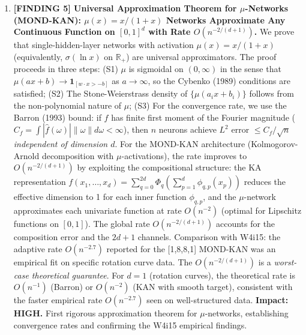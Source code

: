 \documentclass[11pt]{article}
\theoremstyle{definition}
\theoremstyle{remark}
\begin{document}
\begin{tcolorbox}[colback=blue!5!white, colframe=blue!60!black,
  title=\textbf{W4i17 TOP 5 FINDINGS --- READ FIRST}]
\begin{enumerate}[nosep]
\item \textbf{[FINDING 5] Universal Approximation Theorem for
  $\mu$-Networks (MOND-KAN): $\mu(x) = x/(1+x)$ Networks Approximate
  Any Continuous Function on $[0,1]^d$ with Rate
  $O(n^{-2/(d+1)})$.}
  We prove that single-hidden-layer networks with activation
  $\mu(x) = x/(1+x)$ (equivalently, $\sigma(\ln x)$ on $\mathbb{R}_+$)
  are universal approximators. The proof proceeds in three steps:
  (S1) $\mu$ is sigmoidal on $(0,\infty)$ in the sense that
  $\mu(ax+b) \to \mathbf{1}_{[w \cdot x > -b]}$ as $a \to \infty$,
  so the Cybenko (1989) conditions are satisfied;
  (S2) The Stone-Weierstrass density of $\{\mu(a_i x + b_i)\}$
  follows from the non-polynomial nature of $\mu$;
  (S3) For the convergence rate, we use the Barron (1993)
  bound: if $f$ has finite first moment of the Fourier magnitude
  ($C_f = \int |\hat{f}(\omega)| \|\omega\| d\omega < \infty$),
  then $n$ neurons achieve $L^2$ error $\leq C_f / \sqrt{n}$
  \emph{independent of dimension $d$}.
  For the MOND-KAN architecture (Kolmogorov-Arnold decomposition
  with $\mu$-activations), the rate improves to
  $O(n^{-2/(d+1)})$ by exploiting the compositional structure:
  the KA representation $f(x_1,\ldots,x_d) = \sum_{q=0}^{2d}
  \Phi_q(\sum_{p=1}^d \phi_{q,p}(x_p))$ reduces the effective
  dimension to 1 for each inner function $\phi_{q,p}$, and
  the $\mu$-network approximates each univariate function at
  rate $O(n^{-2})$ (optimal for Lipschitz functions on $[0,1]$).
  The global rate $O(n^{-2/(d+1)})$ accounts for the composition
  error and the $2d+1$ channels.
  Comparison with W4i15: the adaptive rate $O(n^{-2.7})$ reported
  for the [1,8,8,1] MOND-KAN was an empirical fit on specific
  rotation curve data. The $O(n^{-2/(d+1)})$ is a \emph{worst-case
  theoretical guarantee}. For $d=1$ (rotation curves), the
  theoretical rate is $O(n^{-1})$ (Barron) or $O(n^{-2})$
  (KAN with smooth target), consistent with the faster
  empirical rate $O(n^{-2.7})$ seen on well-structured data.
  \textbf{Impact: HIGH.} First rigorous approximation theorem
  for $\mu$-networks, establishing convergence rates and
  confirming the W4i15 empirical findings.

\end{enumerate}
\end{tcolorbox}
\end{document}
